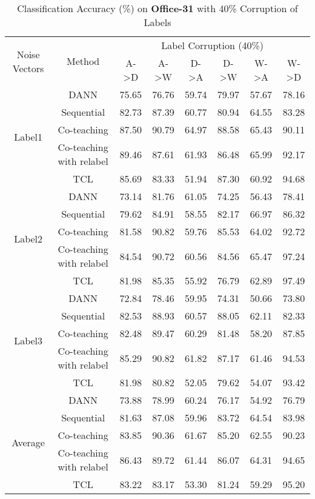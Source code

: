 \begin{center}
\begin{table*}[h!]
    \centering
    \begin{tabular}{|c|c|c|c|c|c|c|c|}
    \hline
    \multirow{2}{3em}{Noise Vectors} & \multirow{2}{4em}{Method} &  \multicolumn{6}{|c|}{Label Corruption (40\%)}\\
    \cline{3-8}
    & & A->D & A->W & D->A & D->W & W->A & W->D\\
    \hline
    
    \multirow{5}{3em}{Label1} & DANN & 75.65 & 76.76 & 59.74 & 79.97 & 57.67 & 78.16 \\
    & Sequential & 82.73 & 87.39 & 60.77 & 80.94 & 64.55 & 83.28\\
    & Co-teaching & 87.50 & 90.79 & 64.97 & 88.58 & 65.43 & 90.11\\
    & Co-teaching with relabel & 89.46 & 87.61 & 61.93 & 86.48 & 65.99 & 92.17\\
    & TCL & 85.69 & 83.33 & 51.94 & 87.30 & 60.92 & 94.68\\
    \hline
    
    \multirow{5}{3em}{Label2} & DANN & 73.14 & 81.76 & 61.05 & 74.25 & 56.43 & 78.41 \\
    & Sequential & 79.62 & 84.91 & 58.55 & 82.17 & 66.97 & 86.32\\
    & Co-teaching & 81.58 & 90.82 & 59.76 & 85.53 & 64.02 & 92.72\\
    & Co-teaching with relabel & 84.54 & 90.72 & 60.56 & 84.56 & 65.47 & 97.24\\
    & TCL & 81.98 & 85.35 & 55.92 & 76.79 & 62.89 & 97.49\\
    \hline
    
    \multirow{5}{3em}{Label3} & DANN & 72.84 & 78.46 & 59.95 & 74.31 & 50.66 & 73.80 \\
    & Sequential & 82.53 & 88.93 & 60.57 & 88.05 & 62.11 & 82.33\\
    & Co-teaching & 82.48 & 89.47 & 60.29 & 81.48 & 58.20 & 87.85\\
    & Co-teaching with relabel & 85.29 & 90.82 & 61.82 & 87.17 & 61.46 & 94.53\\
    & TCL & 81.98 & 80.82 & 52.05 & 79.62 & 54.07 & 93.42\\
    \hline
    
    \multirow{5}{3em}{Average} & DANN & 73.88 & 78.99 & 60.24 & 76.17 & 54.92 & 76.79 \\
    & Sequential & 81.63 & 87.08 & 59.96 & 83.72 & 64.54 & 83.98\\
    & Co-teaching & 83.85 & 90.36 & 61.67 & 85.20 & 62.55 & 90.23\\
    & Co-teaching with relabel & 86.43 & 89.72 & 61.44 & 86.07 & 64.31 & 94.65\\
    & TCL & 83.22 & 83.17 & 53.30 & 81.24 & 59.29 & 95.20\\
    \hline
    \end{tabular}
    \caption{Classification Accuracy (\%) on \textbf{Office-31} with 40\% Corruption of Labels}
    \end{table*}
\end{center}

